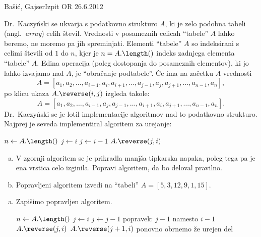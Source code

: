 \begin{naloga}{Bašić, Gajser}{Izpit OR 26.6.2012}
\begin{vprasanje}
Dr.~Kaczyński se ukvarja s podatkovno strukturo $A$,
ki je zelo podobna tabeli (angl.~{\em array}) celih števil.
Vrednosti v posameznih celicah ``tabele'' $A$ lahko beremo,
ne moremo pa jih spreminjati.
Elementi ``tabele'' $A$ so indeksirani s celimi števili od $1$ do $n$,
kjer je $n = A.\length()$ indeks zadnjega elementa ``tabele'' $A$.
Edina operacija (poleg dostopanja do posameznih elementov),
ki jo lahko izvajamo nad $A$, je ``obračanje podtabele''.
Če ima na začetku $A$ vrednosti
$$
A = [a_1, a_2, \dots, a_{i-1}, a_i, a_{i+1}, \dots, a_{j-1}, a_j, a_{j+1},
     \dots, a_{n-1}, a_n],
$$
po klicu ukaza $A.\reverse(i, j)$ izgleda takole:
$$
A = [a_1, a_2, \dots, a_{i-1}, a_j, a_{j-1}, \dots, a_{i+1}, a_i, a_{j+1},
     \dots, a_{n-1}, a_n] .
$$
Dr.~Kaczyński se je lotil implementacije algoritmov
nad to podatkovno strukturo.
Najprej je seveda implementiral algoritem za urejanje:
\begin{small}
\begin{algorithmic}
\State $n \gets A.\length()$
    \State $j \gets i$
        \State $j \gets i-1$
    \EndWhile
    \State $A.\reverse(j, i)$
        \State
    \EndIf
\EndFor
\end{algorithmic}
\end{small}

\begin{enumerate}[(a)]
\item V zgornji algoritem se je prikradla manjša tipkarska napaka,
poleg tega pa je ena vrstica celo izginila.
Popravi algoritem, da bo deloval pravilno.

\item Popravljeni algoritem izvedi na ``tabeli'' $A = [5, 3, 12, 9, 1, 15]$.
\end{enumerate}
\end{vprasanje}

\begin{odgovor}
\begin{enumerate}[(a)]
\item Zapišimo popravljen algoritem.
\begin{small}
\begin{algorithmic}
\State $n \gets A.\length()$
    \State $j \gets i$
        \State $j \gets j-1$ \hfill popravek: $j-1$ namesto $i-1$
    \EndWhile
    \State $A.\reverse(j, i)$
        \State $A.\reverse(j+1, i)$ \hfill ponovno obrnemo že urejen del
    \EndIf
\EndFor
\end{algorithmic}
\end{small}


\end{enumerate}
\end{odgovor}
\end{naloga}
